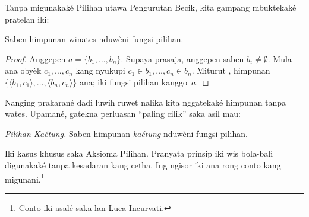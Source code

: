 \documentclass[../../../include/open-logic-section]{subfiles}
\begin{document}

Tanpa migunakaké Pilihan utawa Pengurutan Becik, kita gampang
mbuktekaké pratelan iki:

\begin{lem}
Saben himpunan winates nduwèni fungsi pilihan.
\end{lem}

\begin{proof}
Anggepen $a = \{b_1, \ldots, b_n\}$. Supaya prasaja, anggepen saben
$b_i \neq \emptyset$. Mula ana obyèk $c_1, \ldots, c_n$ kang nyukupi
$c_1 \in b_1, \ldots, c_n \in b_n$. Miturut
, himpunan $\{\langle b_1,
c_1\rangle , \ldots, \langle b_n, c_n\rangle\}$ ana; iki fungsi
pilihan kanggo~$a$.
\end{proof}

Nanging prakarané dadi luwih ruwet nalika kita nggatekaké himpunan
tanpa wates. Upamané, gatekna perluasan ``paling cilik'' saka asil mau:

\begin{defish}
\emph{Pilihan Kaétung.} Saben himpunan \emph{kaétung} nduwèni fungsi pilihan.
\end{defish}

Iki kasus khusus saka Aksioma Pilihan. Pranyata prinsip iki wis
bola-bali digunakaké tanpa kesadaran kang cetha. Ing ngisor iki ana
rong conto kang migunani.\footnote{Conto iki asalé saka
\citet[\S9.4]{Potter2004} lan Luca Incurvati.}
\end{document}
